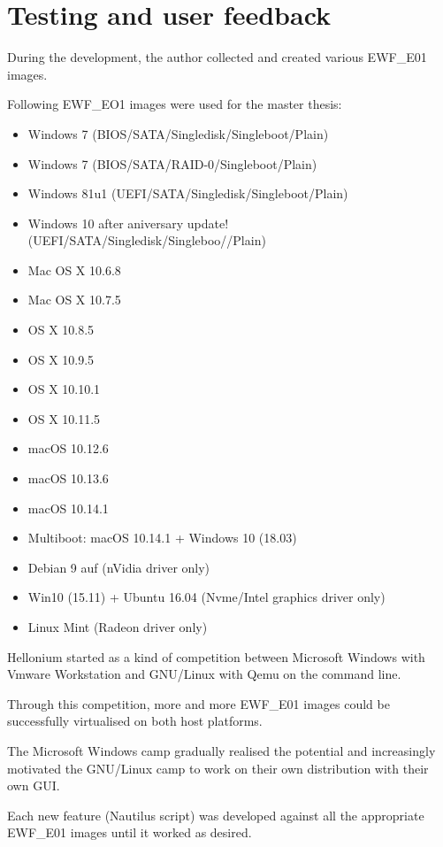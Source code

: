 \chapter{Testing and user feedback}
\label{chap:testing}

During the development, the author collected and created various EWF\_E01 images.

Following EWF\_EO1 images were used for the master thesis:

\begin{itemize}
    \item Windows 7 (BIOS/SATA/Singledisk/Singleboot/Plain)
    \item Windows 7 (BIOS/SATA/RAID-0/Singleboot/Plain)
    \item Windows 81u1 (UEFI/SATA/Singledisk/Singleboot/Plain)
    \item Windows 10 after aniversary update! (UEFI/SATA/Singledisk/Singleboo//Plain)
    \item Mac OS X 10.6.8
    \item Mac OS X 10.7.5
    \item OS X 10.8.5
    \item OS X 10.9.5
    \item OS X 10.10.1
    \item OS X 10.11.5
    \item macOS 10.12.6
    \item macOS 10.13.6
    \item macOS 10.14.1
    \item Multiboot: macOS 10.14.1 + Windows 10 (18.03)
    \item Debian 9 auf (nVidia driver only)
    \item Win10 (15.11) + Ubuntu 16.04 (Nvme/Intel graphics driver only)
    \item Linux Mint (Radeon driver only)
\end{itemize}

Hellonium started as a kind of competition between Microsoft Windows with Vmware Workstation and GNU/Linux with Qemu on the command line.

Through this competition, more and more EWF\_E01 images could be successfully virtualised on both host platforms.

The Microsoft Windows camp gradually realised the potential and increasingly motivated the GNU/Linux camp to work on their own distribution with their own GUI.

Each new feature (Nautilus script) was developed against all the appropriate EWF\_E01 images until it worked as desired.

